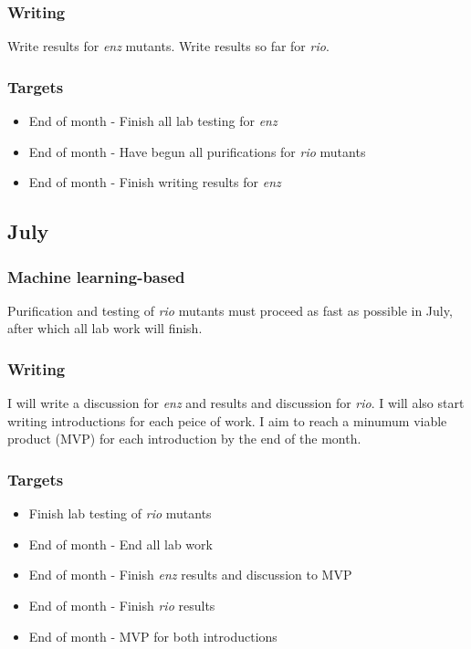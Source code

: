 \documentclass{article}
\begin{document}
\subsubsection{Writing}
Write results for \textit{enz} mutants. Write results so far for \textit{rio}.
\subsubsection{Targets}
\begin{itemize}
\item End of month - Finish all lab testing for \textit{enz}
\item End of month - Have begun all purifications for \textit{rio} mutants
\item End of month - Finish writing results for \textit{enz}
\end{itemize}


\subsection{July}
\subsubsection{Machine learning-based}
Purification and testing of \textit{rio} mutants must proceed as fast as possible in July, after which all lab work will finish.
\subsubsection{Writing}
I will write a discussion for \textit{enz} and  results and discussion for \textit{rio}. %
I will also start writing introductions for each peice of work. I aim to reach a minumum viable product (MVP) for each introduction by the end of the month.
\subsubsection{Targets}
\begin{itemize}
\item Finish lab testing of \textit{rio} mutants
\item End of month - End all lab work
\item End of month - Finish \textit{enz} results and discussion to MVP
\item End of month - Finish \textit{rio} results
\item End of month - MVP for both introductions
\end{itemize}
\end{document}
